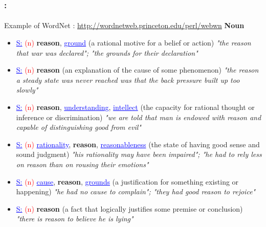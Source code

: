 \documentclass[xcolor=table]{beamer}
\begin{document}
\begin{frame}
	\frametitle{\insertshortsubtitle: \insertsection}
	\framesubtitle{\insertsubsection}

	\vspace{-6pt}
	\begin{exampleblock}{Example of WordNet : \small\url{http://wordnetweb.princeton.edu/perl/webwn}}
		\fontsize{6}{6}\selectfont
		{\small\bfseries Noun}
		\begin{itemize}\setlength\itemsep{0pt}
			\item \textcolor{blue}{\underline{S:}} \textcolor{red}{(n)} \textbf{reason}, \textcolor{blue}{\underline{ground}} (a rational motive for a belief or action) \textit{"the reason that war was declared"; "the grounds for their declaration"}
			\item \textcolor{blue}{\underline{S:}} \textcolor{red}{(n)} \textbf{reason} (an explanation of the cause of some phenomenon) \textit{"the reason a steady state was never reached was that the back pressure built up too slowly"}
			\item \textcolor{blue}{\underline{S:}} \textcolor{red}{(n)} \textbf{reason}, \textcolor{blue}{\underline{understanding}}, \textcolor{blue}{\underline{intellect}} (the capacity for rational thought or inference or discrimination) \textit{"we are told that man is endowed with reason and capable of distinguishing good from evil"}
			\item \textcolor{blue}{\underline{S:}} \textcolor{red}{(n)} \textcolor{blue}{\underline{rationality}}, \textbf{reason}, \textcolor{blue}{\underline{reasonableness}} (the state of having good sense and sound judgment) \textit{"his rationality may have been impaired"; "he had to rely less on reason than on rousing their emotions"}
			\item \textcolor{blue}{\underline{S:}} \textcolor{red}{(n)} \textcolor{blue}{\underline{cause}}, \textbf{reason}, \textcolor{blue}{\underline{grounds}} (a justification for something existing or happening) \textit{"he had no cause to complain"; "they had good reason to rejoice"}
			\item \textcolor{blue}{\underline{S:}} \textcolor{red}{(n)} \textbf{reason} (a fact that logically justifies some premise or conclusion) \textit{"there is reason to believe he is lying"}
		\end{itemize}
		

\end{exampleblock}
\end{frame}
\end{document}
